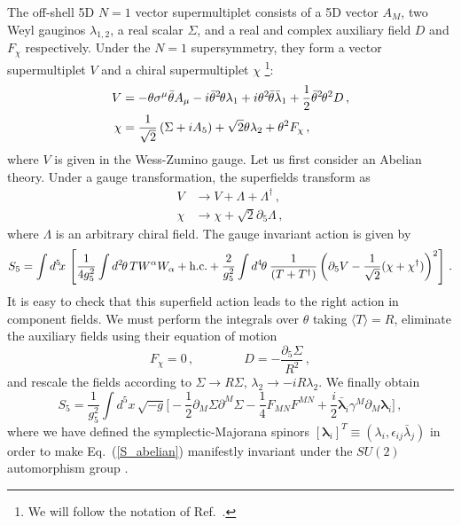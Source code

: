 \documentclass[a4paper,12pt]{article}
\newcommand{\BLambda}{\boldsymbol{\lambda}}
\begin{document}
The off-shell 5D $N=1$ vector supermultiplet 
consists of  a 5D vector $A_M$, two
Weyl gauginos $\lambda_{1,2}$, a real scalar $\Sigma$,
and a real and complex  auxiliary field $D$ and  $F_\chi$ respectively.
Under the
$N=1$ supersymmetry, they form a vector supermultiplet $V$ and a chiral
supermultiplet ${ \chi}$
\footnote{We will follow the notation of  Ref.~\cite{wb}.}:
\begin{align}
    V & = -\theta \sigma^{\mu} \bar{\theta} A_{\mu} -
    i\bar{\theta}^2\mspace{-2mu}\theta\lambda_{1} +
    i\theta^2\mspace{-2mu}\bar{\theta}\bar{\lambda}_{1} +
    \frac{1}{2} \bar{\theta}^2\mspace{-2mu}\theta^2 D\, ,\nonumber \\
    \chi &= \frac{1}{\sqrt{2}} \left(\Sigma + i A_{5}\right) +
    \sqrt{2} \theta \lambda_{2} + \theta^{2} F_\chi\, ,
\end{align}
where $V$ is given in the Wess-Zumino gauge.
Let us first consider an Abelian theory.  
Under a gauge transformation, the superfields transform as
\begin{align}
V&\rightarrow V+\Lambda+\Lambda^{\dag}\, ,\nonumber\\
\chi&\rightarrow \chi+\sqrt{2}\partial_5\Lambda\, ,
\end{align}
where $\Lambda$ is an arbitrary chiral field. 
The gauge invariant action is
given by
\begin{equation}
    S_5 = \int d^{5}\! x\, 
\left[ \frac{1}{4g^2_5} \int d^2\mspace{-2mu}\theta\, T
        W^{\alpha}W_{\alpha} + \text{h.c.} + \frac{2}{g^2_5} \int
         d^4\mspace{-2mu}\theta\: \frac{1}{(T +
          T^{\dag})} \left( \partial_5 V - \frac{1}{\sqrt{2}} (\chi +
            \chi^{\dag})\right)^2 \right]\, .
\label{GaugeAb}
\end{equation}
It is easy to check that this superfield action leads to the right
action in component fields.  We must perform the integrals over $\theta$
taking $\langle T\rangle=R$, eliminate the auxiliary fields using their
equation of motion
\begin{equation}
F_\chi=0\, , \qquad\qquad D= - \frac{\partial_{5}\Sigma}{R^2}\, ,
\end{equation}
and rescale the fields according to $\Sigma
\rightarrow R \Sigma$, $ \lambda_2
\rightarrow - i R \lambda_2$.  We finally obtain
\begin{equation}
S_5 = \frac{1}{g^2_5}\int d^{5}\! x\, \sqrt{-g} \biggl[ 
-\frac{1}{2}\partial_{M}\Sigma
    \partial^{M} \Sigma - \frac{1}{4} F_{MN} F^{MN} 
+ \frac{i}{2} \bar{\BLambda}_{i}
    \gamma^{M} \partial_{M} {\BLambda}_{i}
    \biggr]\, ,
    \label{S_abelian}
\end{equation}
where we have defined the symplectic-Majorana spinors 
$\left[{\BLambda}_{i}\right]^{T} \equiv (\lambda_{i},
\epsilon_{ij}\bar{\lambda}_{j})$ in order to
make Eq.~(\ref{S_abelian}) manifestly invariant under the $SU(2)$
automorphism group \cite{pm}.
\end{document}
